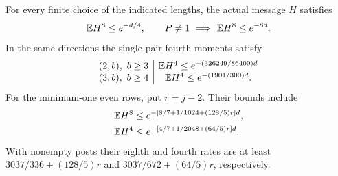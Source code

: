 \begin{proposition}\label{prop:R43:catalogue}
For every finite choice of the indicated lengths, the actual message
\(H\) satisfies
\[
 \mathbb E H^8\le e^{-d/4},\qquad
 P\ne1\ \Longrightarrow\ \mathbb E H^8\le e^{-8d}.
\]
In the same directions the single-pair fourth moments satisfy
\[
 \begin{array}{c|c}
 (2,b),\ b\ge3&\mathbb E H^4\le e^{-(326249/86400)d}\\
 (3,b),\ b\ge4&\mathbb E H^4\le e^{-(1901/300)d}.
 \end{array}
\]
For the minimum-one even rows, put \(r=j-2\). Their bounds include
\[
 \begin{aligned}
 \mathbb E H^8&\le e^{-[8/7+1/1024+(128/5)r]d},\\
 \mathbb E H^4&\le e^{-[4/7+1/2048+(64/5)r]d}.
 \end{aligned}
\]
With nonempty posts their eighth and fourth rates are at least
\(3037/336+(128/5)r\) and \(3037/672+(64/5)r\), respectively.
\end{proposition}

